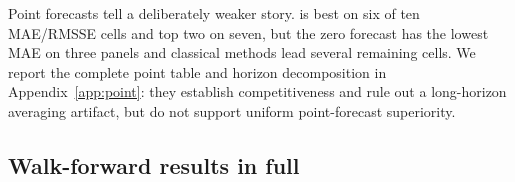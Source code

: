 Point forecasts tell a deliberately weaker story. \EBB{} is best on six
of ten MAE/RMSSE cells and top two on seven, but the zero forecast has the
lowest MAE on three panels and classical methods lead several remaining
cells. We report the complete point table and horizon decomposition in
Appendix~\ref{app:point}: they establish competitiveness and rule out a
long-horizon averaging artifact, but do not support uniform point-forecast
superiority.



\subsection{Walk-forward results in full}
\label{sec:walkforward}

